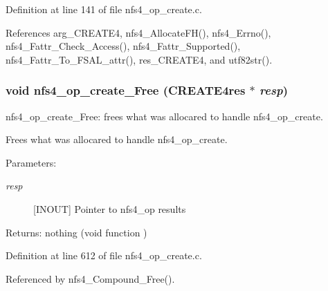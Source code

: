 Definition at line 141 of file nfs4\_\-op\_\-create.c.

References arg\_\-CREATE4, nfs4\_\-Allocate\-FH(), nfs4\_\-Errno(), nfs4\_\-Fattr\_\-Check\_\-Access(), nfs4\_\-Fattr\_\-Supported(), nfs4\_\-Fattr\_\-To\_\-FSAL\_\-attr(), res\_\-CREATE4, and utf82str().
\subsubsection{\setlength{\rightskip}{0pt plus 5cm}void nfs4\_\-op\_\-create\_\-Free (CREATE4res $\ast$ {\em resp})}\label{nfs4__op__create_8c_a3}


nfs4\_\-op\_\-create\_\-Free: frees what was allocared to handle nfs4\_\-op\_\-create.

Frees what was allocared to handle nfs4\_\-op\_\-create.

\begin{Desc}
\item[Parameters:]
\begin{description}
\item[{\em resp}][INOUT] Pointer to nfs4\_\-op results\end{description}
\end{Desc}
\begin{Desc}
\item[Returns:]nothing (void function ) \end{Desc}


Definition at line 612 of file nfs4\_\-op\_\-create.c.

Referenced by nfs4\_\-Compound\_\-Free().
